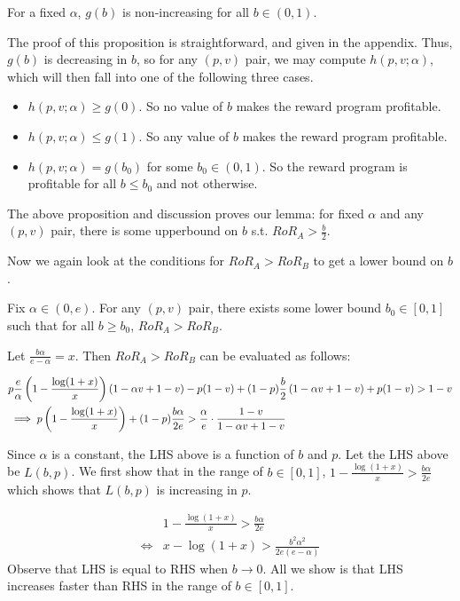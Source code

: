 \begin{proposition}
\label{prop:g_nonincr}
For a fixed $\alpha$, $g(b)$ is non-increasing for all $b \in (0,1)$. 
\end{proposition}

The proof of this proposition is straightforward, and given in the appendix. 
Thus, $g(b)$ is decreasing in $b$, so for any $(p,v)$ pair, we may compute $h(p, v; \alpha)$, which will then fall into one of the following three cases.
\begin{itemize}
\item
$h(p,v;\alpha) \geq g(0)$. So no value of $b$ makes the reward program profitable.
\item
$h(p,v;\alpha) \leq g(1)$. So any value of $b$ makes the reward program profitable.
\item
$h(p,v;\alpha) = g(b_0)$ for some $b_0 \in (0,1)$. So the reward program is profitable for all $b \leq b_0$ and not otherwise.
\end{itemize}

The above proposition and discussion proves our lemma: for fixed $\alpha$ and any $(p,v)$ pair, there is some upperbound on $b$ s.t. $RoR_A > \frac{b}{2}$. 
\endproof

Now we again look at the conditions for $RoR_A > RoR_B$ to get a lower bound on $b$.  
\begin{lemma}
Fix $\alpha \in (0, e)$. For any $(p,v)$ pair, there exists some lower bound $b_0 \in [0,1]$ such that for all $b \geq b_0$, $RoR_A > RoR_B$.
\end{lemma}

\proof
Let $\frac{b\alpha}{e-\alpha} = x$. Then $RoR_A > RoR_B$ can be evaluated as follows:

\begin{eqnarray}
& p\frac{e}{\alpha}\left(1-\frac{\log(1+x)}{x}\right)(1-\alpha v + 1 - v) - p(1-v) + (1-p)\frac{b}{2}\left(1-\alpha v + 1-v\right) + p(1-v) > 1-v\notag\\
& \implies p\left(1 - \frac{\log(1+x)}{x}\right) + (1-p)\frac{b\alpha}{2e} > \frac{\alpha}{e} \cdot \frac{1-v}{1-\alpha v + 1 - v}\label{eq:ra>rb}
\end{eqnarray}

Since $\alpha$ is a constant, the LHS above is a function of $b$ and $p$. 
Let the LHS above be $L(b,p)$.
We first show that in the range of $b\in [0,1]$, $1 - \frac{\log(1+x)}{x} > \frac{b\alpha}{2e}$ which shows that $L(b,p)$ is increasing in $p$.

\begin{align*}
& 1-\frac{\log(1+x)}{x} > \frac{b\alpha}{2e}\\
\Leftrightarrow & x - \log(1+x) > \frac{b^2\alpha^2}{2e(e-\alpha)}
\end{align*}
Observe that LHS is equal to RHS when $b\rightarrow 0$. 
All we show is that LHS increases faster than RHS in the range of $b\in [0,1]$. 

